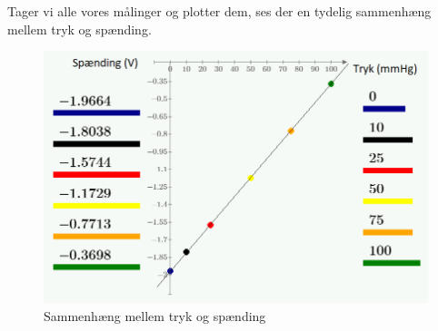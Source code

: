 Tager vi alle vores målinger og plotter dem, ses der en tydelig sammenhæng mellem tryk og spænding.

\vspace{0.5 cm}

\begin{figure}[h!]
	\centering
	\includegraphics[width=0.75\linewidth]{../Rapport/Implementering_og_test/Hardware/integrationsplothw}
	\caption{Sammenhæng mellem tryk og spænding}
	\label{fig:iplot}
\end{figure}

\clearpage